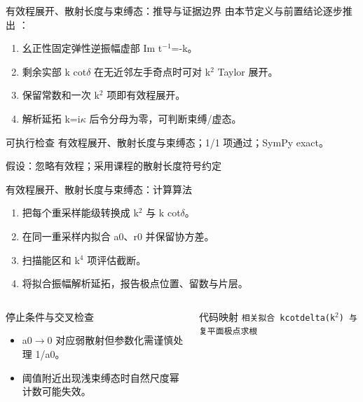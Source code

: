 \begin{frame}[t]{有效程展开、散射长度与束缚态：推导与证据边界}
\footnotesize
{}\quad 由本节定义与前置结论逐步推出 ：
\begin{enumerate}
\item 幺正性固定弹性逆振幅虚部 Im t\ensuremath{^{-1}}=-k。
\item 剩余实部 k cot\ensuremath{\delta} 在无近邻左手奇点时可对 k\ensuremath{^{2}} Taylor 展开。
\item 保留常数和一次 k\ensuremath{^{2}} 项即有效程展开。
\item 解析延拓 k=i\ensuremath{\kappa} 后令分母为零，可判断束缚/\allowbreak{}虚态。
\end{enumerate}\begin{block}{可执行检查}
\quad 有效程展开、散射长度与束缚态；1/1 项通过；SymPy exact。
\par\scriptsize 假设：忽略有效程；采用课程的散射长度符号约定
\end{block}
\end{frame}

\begin{frame}[t]{有效程展开、散射长度与束缚态：计算算法}
\footnotesize
{}\begin{enumerate}
\item 把每个重采样能级转换成 k\ensuremath{^{2}} 与 k cot\ensuremath{\delta}。
\item 在同一重采样内拟合 a0、r0 并保留协方差。
\item 扫描能区和 k\ensuremath{^{4}} 项评估截断。
\item 将拟合振幅解析延拓，报告极点位置、留数与片层。
\end{enumerate}\begin{columns}[T,onlytextwidth]
\begin{block}{停止条件与交叉检查}\scriptsize\begin{itemize}
\item[\CheckMark] a0\ensuremath{\rightarrow}0 对应弱散射但参数化需谨慎处理 1/\allowbreak{}a0。
\item[\CheckMark] 阈值附近出现浅束缚态时自然尺度幂计数可能失效。
\end{itemize}\end{block}
\begin{block}{代码映射}
\scriptsize \texttt{相关拟合 kcotdelta(k\ensuremath{^{2}}) 与复平面极点求根}
\end{block}\end{columns}\end{frame}

